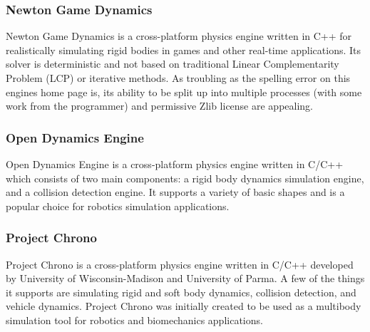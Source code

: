 \documentclass[onecolumn, draftclsnofoot,10pt, compsoc]{IEEEtran}
\begin{document}
\begin{singlespace}
\subsubsection{Newton Game Dynamics}
Newton Game Dynamics is a cross-platform physics engine written in C++ for realistically simulating rigid bodies in games and other real-time applications.
Its solver is deterministic and not based on traditional Linear Complementarity Problem (LCP) or iterative methods.
As troubling as the spelling error on this engines home page is, its ability to be split up into multiple processes (with some work from the programmer) and permissive Zlib license are appealing.
\cite{NewtonGameDynamics}

\subsubsection{Open Dynamics Engine}
Open Dynamics Engine is a cross-platform physics engine written in C/C++ which consists of two main components: a rigid body dynamics simulation engine, and a collision detection engine.
It supports a variety of basic shapes and is a popular choice for robotics simulation applications.
\cite{OpenDynamicsEngine}

\subsubsection{Project Chrono}
Project Chrono is a cross-platform physics engine written in C/C++ developed by University of Wisconsin-Madison and University of Parma.
A few of the things it supports are simulating rigid and soft body dynamics, collision detection, and vehicle dynamics.
Project Chrono was initially created to be used as a multibody simulation tool for robotics and biomechanics applications.
\cite{ProjectChrono}


\end{singlespace}
\end{document}
